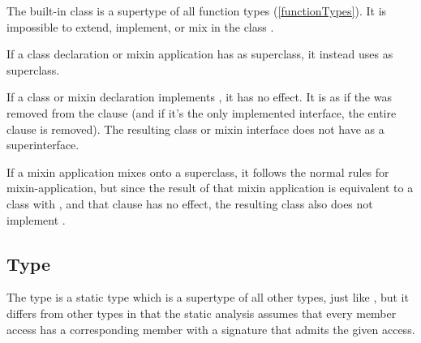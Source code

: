 \documentclass[makeidx]{article}
\begin{document}
{\LMHash{}%
The built-in class \FUNCTION{} is a supertype of all function types
(\ref{functionTypes}).
It is impossible to extend, implement, or mix in the class \FUNCTION.

\LMHash{}%
If a class declaration or mixin application has \FUNCTION{} as superclass,
it instead uses  as superclass.

\LMHash{}%
If a class or mixin declaration implements \FUNCTION, it has no effect.
It is as if the \FUNCTION{} was removed from the  clause
(and if it's the only implemented interface, the entire clause is removed).
The resulting class or mixin interface
does not have \FUNCTION{} as a superinterface.

\LMHash{}%
If a mixin application mixes \FUNCTION{} onto a superclass, it follows the
normal rules for mixin-application, but since the result of that mixin
application is equivalent to a class with , and
that clause has no effect, the resulting class also does not
implement \FUNCTION. 



\subsection{Type \DYNAMIC}

\LMHash{}%
The type \DYNAMIC{} is a static type which is a supertype of all other types,
just like ,
but it differs from other types in that the static analysis
assumes that every member access has a corresponding member
with a signature that admits the given access.


}
\end{document}
